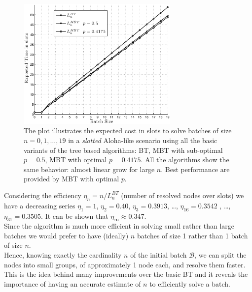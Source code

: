 \documentclass[11pt,a4paper,twoside,openright]{book}
\begin{document}
\begin{figure}[H]
\begin{center}
\includegraphics[width=0.7\textwidth]{matlab/BTs/bin-trees-expected-time}
\caption[Expected cost for tree algorithms in \emph{slotted-ALOHA} scenario]{The plot illustrates the expected cost in slots to solve batches of size $n=0,1,\ldots,19$ in a \emph{slotted} Aloha-like scenario using all the basic variants of the tree based algorithms: BT, MBT with sub-optimal $p=0.5$, MBT with optimal $p=0.4175$. All the algorithms show the same behavior: almost linear grow for large $n$. Best performance are provided by MBT with optimal $p$.}
\label{fig:BTs performances}
\end{center}
\end{figure}

Considering the efficiency $\eta_{n}=n/L_{n}^{BT}$ (number of resolved nodes over slots) we have a decreasing series $\eta_{1}=1$, $\eta_{2}=0.40$, $\eta_{3}=0.3913$, \dots, $\eta_{16}=0.3542$ , \dots, $\eta_{31}=0.3505$. It can be shown \cite{capetanakis} that $\eta_{\infty} \approx 0.347$.\\

Since the algorithm is much more efficient in solving small rather than large batches we would prefer to have (ideally)  $n$ batches of size 1 rather than 1 batch of size $n$.\\
Hence, knowing exactly the cardinality $n$ of the initial batch $\mathcal{B}$, we can split the nodes into small groups, of approximately 1 node each, and resolve them faster. \\This is the idea behind many improvements over the basic BT and it reveals the importance of having an accurate estimate of $n$ to efficiently solve a batch.
\end{document}
